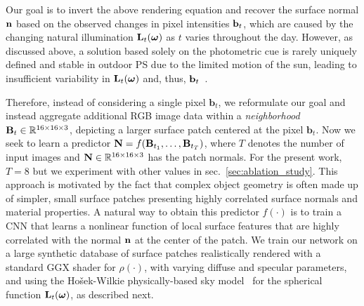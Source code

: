 Our goal is to invert the above rendering equation and recover the surface normal ${\bf n}$ based on the observed changes in pixel intensities ${\bf b}_t$, which are caused by the changing natural illumination ${\bf L}_t(\mathbf{\boldsymbol \omega})$ as $t$ varies throughout the day. However, as discussed above, a solution based solely on the photometric cue is rarely uniquely defined and stable in outdoor PS due to the limited motion of the sun, leading to insufficient variability in ${\bf L}_t(\mathbf{\boldsymbol \omega})$ and, thus, ${\bf b}_t$~\cite{holdgeoffroy-3dv-15}.

Therefore, instead of considering a single pixel $\mathbf{b}_t$, we reformulate our goal and instead aggregate additional RGB image data within a \emph{neighborhood} ${\bf B}_t \in \mathbb{R}^{16 \times 16 \times 3}$, depicting a larger surface patch centered at the pixel $\mathbf{b}_t$. Now we seek to learn a predictor ${\bf N} = f({\bf B}_{t_1}, \ldots, {\bf B}_{t_T})$, where $T$ denotes the number of input images and ${\bf N} \in \mathbb{R}^{16\times 16\times 3}$ has the patch normals. For the present work, $T=8$ but we experiment with other values in sec.~\ref{sec:ablation_study}. This approach is motivated by the fact that complex object geometry is often made up of simpler, small surface patches presenting highly correlated surface normals and material properties. A natural way to obtain this predictor $f(\cdot)$ is to train a CNN that learns a nonlinear function of local surface features that are highly correlated with the normal ${\bf n}$ at the center of the patch. We train our network on a large synthetic database of surface patches realistically rendered with a standard GGX shader for $\rho(\cdot)$, with varying diffuse and specular parameters, and using the Ho\v{s}ek-Wilkie physically-based sky model~\cite{hosek-tog-12} for the spherical function ${\bf L}_t(\mathbf{\boldsymbol \omega})$, as described next.





